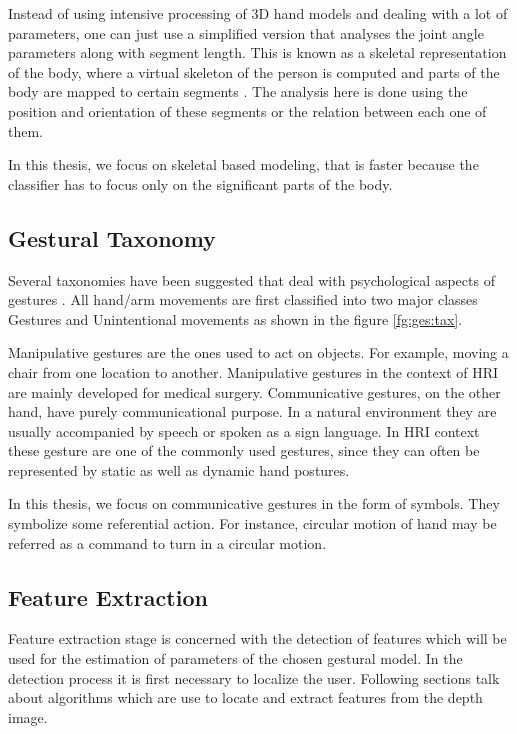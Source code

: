 Instead of using intensive processing of 3D hand models and dealing with a lot of parameters, one can just use a simplified version that analyses the joint angle parameters along with segment length. This is known as a skeletal representation of the body, where a virtual skeleton of the person is computed and parts of the body are mapped to certain segments \cite{2}. The analysis here is done using the position and orientation of these segments or the relation between each one of them.

In this thesis, we focus on skeletal based modeling, that is faster because the classifier has to focus only on the significant parts of the body.

\subsection{Gestural Taxonomy} Several taxonomies have been suggested that deal with psychological aspects of gestures \cite{2}. All hand/arm movements are first classified into two major classes Gestures and Unintentional movements as shown in the figure \ref{fg:ges:tax}.



Manipulative gestures are the ones used to act on objects. For example, moving a chair from one location to another. Manipulative gestures in the context of HRI are mainly developed for medical surgery. Communicative gestures, on the other hand, have purely communicational purpose. In a natural environment they are usually accompanied by speech or spoken as a sign language. In HRI context these gesture are one of the commonly used gestures, since they can often be represented by static as well as dynamic hand postures.

In this thesis, we focus on communicative gestures in the form of symbols. They symbolize some referential action. For instance, circular motion of hand may be referred as a command to turn in a circular motion.

\subsection{Feature Extraction} Feature extraction stage is concerned with the detection of features which will be used for the estimation of parameters of the chosen gestural model. In the detection process it is first necessary to localize the user. Following sections talk about algorithms which are use to locate and extract features from the depth image.

